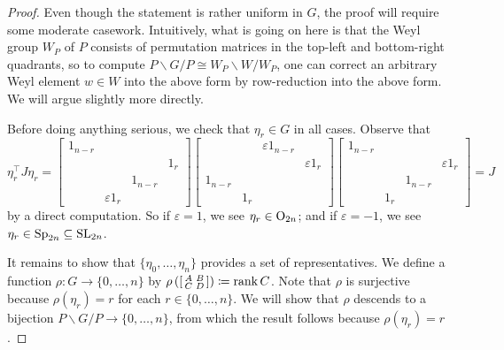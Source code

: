 \begin{proof}
    Even though the statement is rather uniform in $G$, the proof will require some moderate casework. Intuitively, what is going on here is that the Weyl group $W_P$ of $P$ consists of permutation matrices in the top-left and bottom-right quadrants, so to compute $P\backslash G/P\cong W_P\backslash W/W_P$, one can correct an arbitrary Weyl element $w\in W$ into the above form by row-reduction into the above form. We will argue slightly more directly.

    Before doing anything serious, we check that $\eta_r\in G$ in all cases. Observe that
    \[\eta_r^\intercal J\eta_r=\begin{bmatrix}
        1_{n-r} \\ &&& 1_r \\
        && 1_{n-r} \\
        & \varepsilon1_r
    \end{bmatrix}\begin{bmatrix}
        && \varepsilon1_{n-r} \\
        &&& \varepsilon1_r \\
        1_{n-r} \\
        & 1_r
    \end{bmatrix}\begin{bmatrix}
        1_{n-r} \\ &&& \varepsilon1_r \\
        && 1_{n-r} \\
        & 1_r
    \end{bmatrix}=J\]
    by a direct computation. So if $\varepsilon=1$, we see $\eta_r\in\mathrm{O}_{2n}$; and if $\varepsilon=-1$, we see $\eta_r\in\mathrm{Sp}_{2n}\subseteq\mathrm{SL}_{2n}$.

    It remains to show that $\{\eta_0,\ldots,\eta_n\}$ provides a set of representatives. We define a function $\rho\colon G\to\{0,\ldots,n\}$ by $\rho\left(\begin{bsmallmatrix}
        A & B \\ C & D
    \end{bsmallmatrix}\right)\coloneqq\operatorname{rank}C$. Note that $\rho$ is surjective because $\rho(\eta_r)=r$ for each $r\in\{0,\ldots,n\}$. We will show that $\rho$ descends to a bijection $P\backslash G/P\to\{0,\ldots,n\}$, from which the result follows because $\rho(\eta_r)=r$.


\end{proof}
